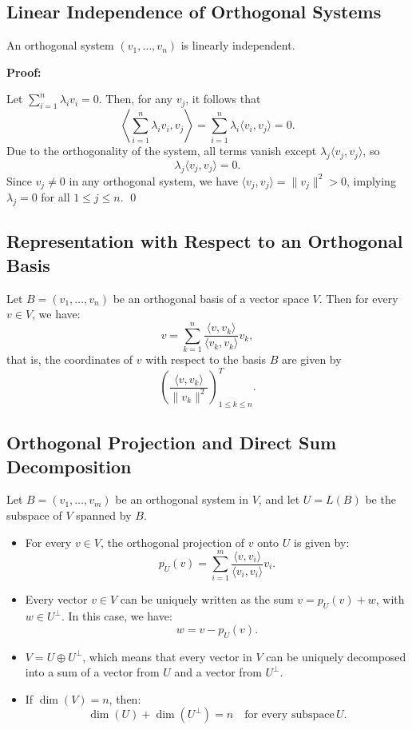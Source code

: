 \subsection{Linear Independence of Orthogonal Systems}
An orthogonal system \( (v_1, \ldots, v_n) \) is linearly independent.
\vspace{\baselineskip}

\textbf{Proof:} 

Let \( \sum_{i=1}^n \lambda_i v_i = 0 \). Then, for any \( v_j \), it follows that
\[
\left\langle \sum_{i=1}^n \lambda_i v_i, v_j \right\rangle = \sum_{i=1}^n \lambda_i \langle v_i, v_j \rangle = 0.
\]
Due to the orthogonality of the system, all terms vanish except \( \lambda_j \langle v_j, v_j \rangle \), so
\[
\lambda_j \langle v_j, v_j \rangle = 0.
\]
Since \( v_j \neq 0 \) in any orthogonal system, we have \( \langle v_j, v_j \rangle = \|v_j\|^2 > 0 \), implying \( \lambda_j = 0 \) for all \( 1 \leq j \leq n \). \qed

\subsection{Representation with Respect to an Orthogonal Basis}

Let \( B = (v_1, \ldots, v_n) \) be an orthogonal basis of a vector space \( V \). Then for every \( v \in V \), we have:
\[
v = \sum_{k=1}^n \frac{\langle v, v_k \rangle}{\langle v_k, v_k \rangle} v_k,
\]
that is, the coordinates of \( v \) with respect to the basis \( B \) are given by
\[
\left( \frac{\langle v, v_k \rangle}{\|v_k\|^2} \right)_{1 \leq k \leq n}^T.
\]


\subsection{Orthogonal Projection and Direct Sum Decomposition}

Let \( B = (v_1, \ldots, v_m) \) be an orthogonal system in \( V \), and let \( U = L(B) \) be the subspace of \( V \) spanned by \( B \).

\begin{itemize}[label=\(-\)]
    \item For every \( v \in V \), the orthogonal projection of \( v \) onto \( U \) is given by:
    \[
    p_U(v) = \sum_{i=1}^{m} \frac{\langle v, v_i \rangle}{\langle v_i, v_i \rangle} v_i.
    \]

    \item Every vector \( v \in V \) can be uniquely written as the sum \( v = p_U(v) + w \), with \( w \in U^\perp \). In this case, we have:
    \[
    w = v - p_U(v).
    \]

    \item \( V = U \oplus U^\perp \), which means that every vector in \( V \) can be uniquely decomposed into a sum of a vector from \( U \) and a vector from \( U^\perp \).

    \item If \( \dim(V) = n \), then:
    \[
    \dim(U) + \dim(U^\perp) = n \quad \text{for every subspace} \, U.
    \]
\end{itemize}

